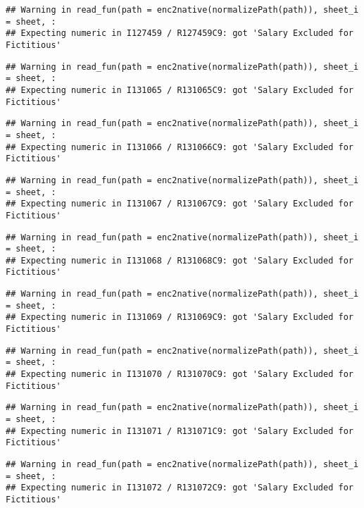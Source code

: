 \documentclass[
]{article}
\begin{document}
\begin{verbatim}
## Warning in read_fun(path = enc2native(normalizePath(path)), sheet_i = sheet, :
## Expecting numeric in I127459 / R127459C9: got 'Salary Excluded for Fictitious'
\end{verbatim}

\begin{verbatim}
## Warning in read_fun(path = enc2native(normalizePath(path)), sheet_i = sheet, :
## Expecting numeric in I131065 / R131065C9: got 'Salary Excluded for Fictitious'
\end{verbatim}

\begin{verbatim}
## Warning in read_fun(path = enc2native(normalizePath(path)), sheet_i = sheet, :
## Expecting numeric in I131066 / R131066C9: got 'Salary Excluded for Fictitious'
\end{verbatim}

\begin{verbatim}
## Warning in read_fun(path = enc2native(normalizePath(path)), sheet_i = sheet, :
## Expecting numeric in I131067 / R131067C9: got 'Salary Excluded for Fictitious'
\end{verbatim}

\begin{verbatim}
## Warning in read_fun(path = enc2native(normalizePath(path)), sheet_i = sheet, :
## Expecting numeric in I131068 / R131068C9: got 'Salary Excluded for Fictitious'
\end{verbatim}

\begin{verbatim}
## Warning in read_fun(path = enc2native(normalizePath(path)), sheet_i = sheet, :
## Expecting numeric in I131069 / R131069C9: got 'Salary Excluded for Fictitious'
\end{verbatim}

\begin{verbatim}
## Warning in read_fun(path = enc2native(normalizePath(path)), sheet_i = sheet, :
## Expecting numeric in I131070 / R131070C9: got 'Salary Excluded for Fictitious'
\end{verbatim}

\begin{verbatim}
## Warning in read_fun(path = enc2native(normalizePath(path)), sheet_i = sheet, :
## Expecting numeric in I131071 / R131071C9: got 'Salary Excluded for Fictitious'
\end{verbatim}

\begin{verbatim}
## Warning in read_fun(path = enc2native(normalizePath(path)), sheet_i = sheet, :
## Expecting numeric in I131072 / R131072C9: got 'Salary Excluded for Fictitious'
\end{verbatim}
\end{document}
